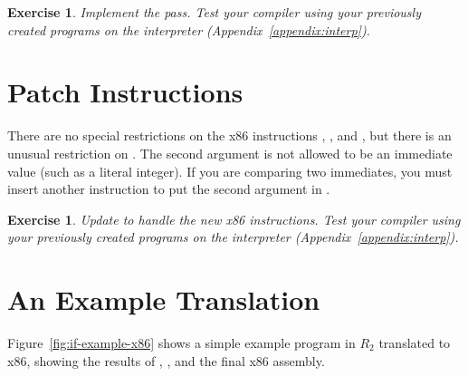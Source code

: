 \documentclass[11pt]{book}
\newtheorem{exercise}[theorem]{Exercise}
\begin{document}
\begin{exercise}\normalfont
Implement the  pass. Test your compiler using
your previously created programs on the  interpreter
(Appendix~\ref{appendix:interp}).
\end{exercise}

\section{Patch Instructions}

There are no special restrictions on the x86 instructions
, , and , but there is an unusual
restriction on . The second argument is not allowed to be an
immediate value (such as a literal integer). If you are comparing two
immediates, you must insert another  instruction to put the
second argument in .

\begin{exercise}\normalfont
Update  to handle the new x86 instructions.
Test your compiler using your previously created programs on the
 interpreter (Appendix~\ref{appendix:interp}).
\end{exercise}


\section{An Example Translation}


Figure~\ref{fig:if-example-x86} shows a simple example program in
$R_2$ translated to x86, showing the results of ,
, and the final x86 assembly.
\end{document}
